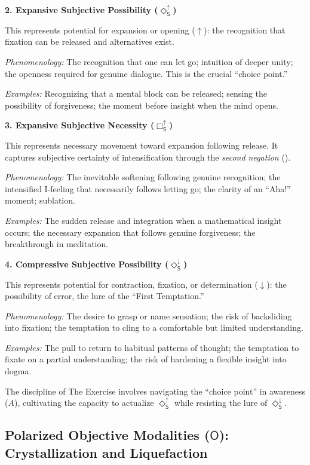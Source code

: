 \documentclass[12pt]{book}
\newcommand{\SBoxUp}{\Box_{\mathsf{S}}^{\uparrow}}
\newcommand{\SDiaUp}{\Diamond_{\mathsf{S}}^{\uparrow}}
\newcommand{\SDiaDown}{\Diamond_{\mathsf{S}}^{\downarrow}}
\newcommand{\sublate}[1]{\cancel{#1}}
\begin{document}
\noindent\textbf{2. Expansive Subjective Possibility ($\SDiaUp$)}

This represents potential for expansion or opening ($\uparrow$): the recognition that fixation can be released and alternatives exist.

\textit{Phenomenology:} The recognition that one can let go; intuition of deeper unity; the openness required for genuine dialogue. This is the crucial ``choice point.''

\textit{Examples:} Recognizing that a mental block can be released; sensing the possibility of forgiveness; the moment before insight when the mind opens.

\bigskip

\noindent\textbf{3. Expansive Subjective Necessity ($\SBoxUp$)}

This represents necessary movement toward expansion following release. It captures subjective certainty of intensification through the \textit{second negation} (\sublate{no}).

\textit{Phenomenology:} The inevitable softening following genuine recognition; the intensified I-feeling that necessarily follows letting go; the clarity of an ``Aha!'' moment; sublation.

\textit{Examples:} The sudden release and integration when a mathematical insight occurs; the necessary expansion that follows genuine forgiveness; the breakthrough in meditation.

\bigskip

\noindent\textbf{4. Compressive Subjective Possibility ($\SDiaDown$)}

This represents potential for contraction, fixation, or determination ($\downarrow$): the possibility of error, the lure of the ``First Temptation.''

\textit{Phenomenology:} The desire to grasp or name sensation; the risk of backsliding into fixation; the temptation to cling to a comfortable but limited understanding.

\textit{Examples:} The pull to return to habitual patterns of thought; the temptation to fixate on a partial understanding; the risk of hardening a flexible insight into dogma.

\bigskip

The discipline of The Exercise involves navigating the ``choice point'' in awareness ($A$), cultivating the capacity to actualize $\SDiaUp$ while resisting the lure of $\SDiaDown$.

\subsection{Polarized Objective Modalities ($\mathsf{O}$): Crystallization and Liquefaction}
\end{document}
